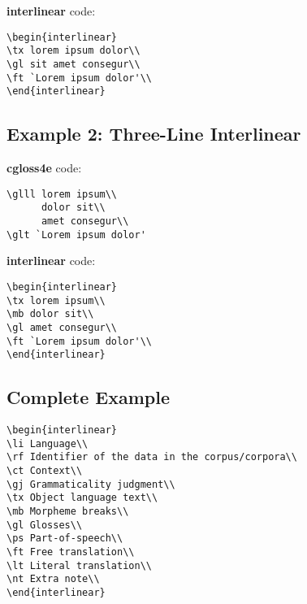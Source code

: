 \documentclass{article}
\begin{document}
\textbf{interlinear} code:
\begin{verbatim}
\begin{interlinear}
\tx lorem ipsum dolor\\
\gl sit amet consegur\\
\ft `Lorem ipsum dolor'\\
\end{interlinear}
\end{verbatim}

\subsection{Example 2: Three-Line Interlinear}
\textbf{cgloss4e} code:
\begin{verbatim}
\glll lorem ipsum\\
      dolor sit\\
      amet consegur\\
\glt `Lorem ipsum dolor'
\end{verbatim}

\textbf{interlinear} code:
\begin{verbatim}
\begin{interlinear}
\tx lorem ipsum\\
\mb dolor sit\\
\gl amet consegur\\
\ft `Lorem ipsum dolor'\\
\end{interlinear}
\end{verbatim}

\subsection{Complete Example}
\begin{verbatim}
\begin{interlinear}
\li Language\\
\rf Identifier of the data in the corpus/corpora\\
\ct Context\\
\gj Grammaticality judgment\\
\tx Object language text\\
\mb Morpheme breaks\\
\gl Glosses\\
\ps Part-of-speech\\
\ft Free translation\\
\lt Literal translation\\
\nt Extra note\\
\end{interlinear}
\end{verbatim}
\end{document}
